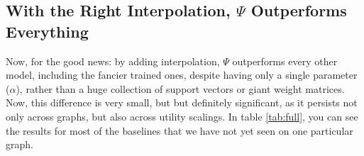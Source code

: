 \documentclass{article}
\theoremstyle{definition}
\begin{document}
	\subsection{With the Right Interpolation, $\Psi$ Outperforms Everything}
	
	Now, for the good news: by adding interpolation, $\Psi$ outperforms every other model, including the fancier trained ones, despite having only a single parameter ($\alpha$), rather than a huge collection of support vectors or giant weight matrices. Now, this difference is very small, but but definitely significant, as it persists not only across graphs, but also across utility scalings. In table \ref{tab:full}, you can see the results for most of the baselines that we have not yet seen on one particular graph. 
	
	\begin{table}
		\centering


\end{table}
\end{document}
